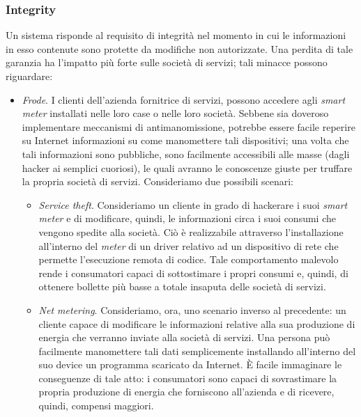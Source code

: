 \subsubsection{Integrity}
Un sistema risponde al requisito di integrità nel momento in cui le informazioni in esso contenute sono protette da modifiche non autorizzate. Una perdita di tale garanzia ha l'impatto più forte sulle società di servizi; tali minacce possono riguardare:
\begin{itemize}
\item \textit{Frode}. I clienti dell'azienda fornitrice di servizi, possono accedere agli \textit{smart meter} installati nelle loro case o nelle loro società. Sebbene sia doveroso implementare meccanismi di antimanomissione, potrebbe essere facile reperire su Internet informazioni su come manomettere tali dispositivi; una volta che tali informazioni sono pubbliche, sono facilmente accessibili alle masse (dagli hacker ai semplici cuoriosi), le quali avranno le conoscenze giuste per truffare la propria società di servizi. Consideriamo due possibili scenari:
	\begin{itemize}
	\item \textit{Service theft}. Consideriamo un cliente in grado di hackerare i suoi \textit{smart meter} e di modificare, quindi, le informazioni circa i suoi consumi che vengono spedite alla società. Ciò è realizzabile attraverso l'installazione all'interno del \textit{meter} di un driver relativo ad un dispositivo di rete che permette l'esecuzione remota di codice. Tale comportamento malevolo rende i consumatori capaci di sottostimare i propri consumi e, quindi, di ottenere bollette più basse a totale insaputa delle società di servizi.
	\item \textit{Net metering}. Consideriamo, ora, uno scenario inverso al precedente: un cliente capace di modificare le informazioni relative alla sua produzione di energia che verranno inviate alla società di servizi. Una persona può facilmente manomettere tali dati semplicemente installando all'interno del suo device un programma scaricato da Internet. È facile immaginare le conseguenze di tale atto: i consumatori sono capaci di sovrastimare la propria produzione di energia che forniscono all'azienda e di ricevere, quindi, compensi maggiori.
	\end{itemize}

\end{itemize}
